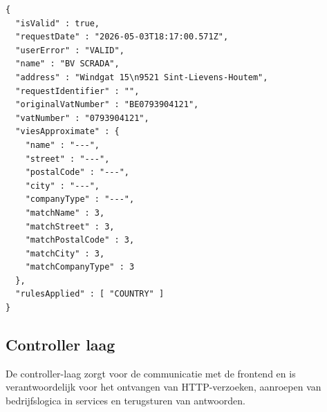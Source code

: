 \begin{listing}[ht]
\begin{verbatim}
{
  "isValid" : true,
  "requestDate" : "2026-05-03T18:17:00.571Z",
  "userError" : "VALID",
  "name" : "BV SCRADA",
  "address" : "Windgat 15\n9521 Sint-Lievens-Houtem",
  "requestIdentifier" : "",
  "originalVatNumber" : "BE0793904121",
  "vatNumber" : "0793904121",
  "viesApproximate" : {
    "name" : "---",
    "street" : "---",
    "postalCode" : "---",
    "city" : "---",
    "companyType" : "---",
    "matchName" : 3,
    "matchStreet" : 3,
    "matchPostalCode" : 3,
    "matchCity" : 3,
    "matchCompanyType" : 3
  },
  "rulesApplied" : [ "COUNTRY" ]
}
\end{verbatim}
\caption{JSON API-response voor KYC-verificatie met VIES.}
\label{lst:vies-api-response}
\end{listing}

\subsection{Controller laag}
De controller-laag zorgt voor de communicatie met de frontend en is verantwoordelijk voor het ontvangen van HTTP-verzoeken, aanroepen van bedrijfslogica in services en terugsturen van antwoorden.

